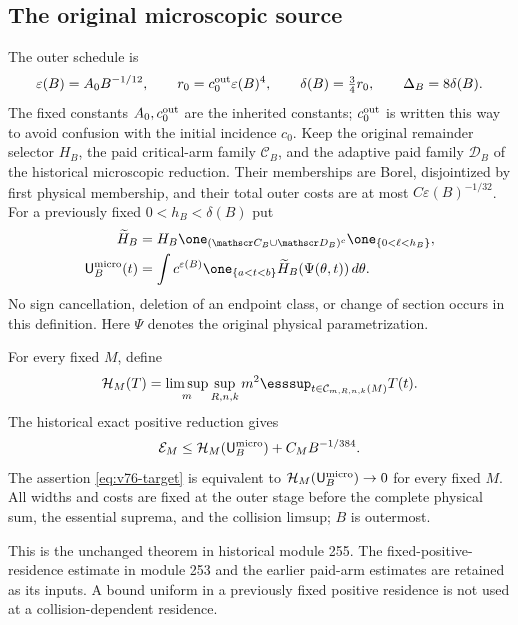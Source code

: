 \subsection{The original microscopic source}
The outer schedule is
\begin{equation}\label{eq:v109-schedule}
 \varepsilon(B)=A_0B^{-1/12},\qquad r_0=c_0^{\rm out}\varepsilon(B)^4,
 \qquad\delta(B)=\tfrac34r_0,\qquad\Delta_B=8\delta(B).
\end{equation}
The fixed constants $A_0,c_0^{\rm out}$ are the inherited constants;
$c_0^{\rm out}$ is written this way to avoid confusion with the
initial incidence $c_0$.
Keep the original remainder selector $H_B$, the paid critical-arm
family $\mathscr C_B$, and the adaptive paid family $\mathscr D_B$
of the historical microscopic reduction. Their memberships are
Borel, disjointized by first physical membership, and their total
outer costs are at most $C\varepsilon(B)^{-1/32}$.
For a previously fixed $0<h_B<\delta(B)$ put
\begin{equation}\label{eq:v109-original-micro}
 \begin{split}
 \widetilde H_B&=H_B\one_{(\mathscr C_B\cup\mathscr D_B)^c}
                       \one_{\{0<\ell<h_B\}},\\
 \mathsf U_B^{\rm micro}(t)
   &=\int c^{\varepsilon(B)}\one_{\{a<t<b\}}
                           \widetilde H_B(\Psi(\theta,t))\,d\theta.
 \end{split}
\end{equation}
No sign cancellation, deletion of an endpoint class, or change of
section occurs in this definition. Here $\Psi$ denotes the original
physical parametrization.

\begin{inputstatement}
\label{input:v109-scalar}
For every fixed $M$, define
\[
 \mathcal H_M(T)=\limsup_m\sup_{R,n,k}m^2
          \esssup_{t\in\mathcal C_{m,R,n,k}(M)}T(t).
\]
The historical exact positive reduction gives
\begin{equation}\label{eq:v109-scalar-input}
 \mathcal E_M\leq\mathcal H_M(\mathsf U_B^{\rm micro})
                              +C_MB^{-1/384}.
\end{equation}
The assertion \eqref{eq:v76-target} is equivalent to
$\mathcal H_M(\mathsf U_B^{\rm micro})\to0$ for every fixed $M$.
All widths and costs are fixed at the outer stage before the
complete physical sum, the essential suprema, and the collision
limsup; $B$ is outermost.
\end{inputstatement}
This is the unchanged theorem in historical module 255. The
fixed-positive-residence estimate in module 253 and the earlier
paid-arm estimates are retained as its inputs. A bound uniform in
a previously fixed positive residence is not used at a
collision-dependent residence.
